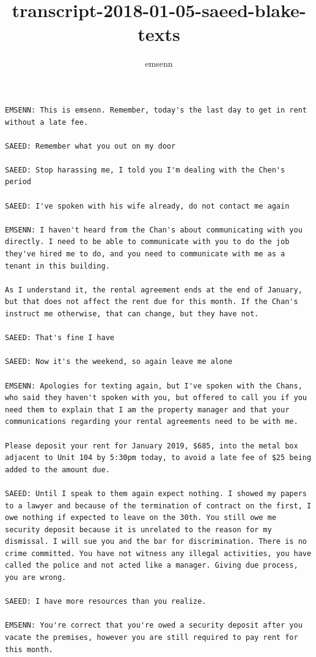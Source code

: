 \documentclass[11pt]{article}
\author{emsenn}
\date{}
\title{transcript-2018-01-05-saeed-blake-texts}
\begin{document}
\maketitle
\begin{verbatim}
EMSENN: This is emsenn. Remember, today's the last day to get in rent
without a late fee.

SAEED: Remember what you out on my door

SAEED: Stop harassing me, I told you I'm dealing with the Chen's
period

SAEED: I've spoken with his wife already, do not contact me again

EMSENN: I haven't heard from the Chan's about communicating with you
directly. I need to be able to communicate with you to do the job
they've hired me to do, and you need to communicate with me as a
tenant in this building.

As I understand it, the rental agreement ends at the end of January,
but that does not affect the rent due for this month. If the Chan's
instruct me otherwise, that can change, but they have not.

SAEED: That's fine I have

SAEED: Now it's the weekend, so again leave me alone

EMSENN: Apologies for texting again, but I've spoken with the Chans,
who said they haven't spoken with you, but offered to call you if you
need them to explain that I am the property manager and that your
communications regarding your rental agreements need to be with me.

Please deposit your rent for January 2019, $685, into the metal box
adjacent to Unit 104 by 5:30pm today, to avoid a late fee of $25 being
added to the amount due.

SAEED: Until I speak to them again expect nothing. I showed my papers
to a lawyer and because of the termination of contract on the first, I
owe nothing if expected to leave on the 30th. You still owe me
security deposit because it is unrelated to the reason for my
dismissal. I will sue you and the bar for discrimination. There is no
crime committed. You have not witness any illegal activities, you have
called the police and not acted like a manager. Giving due process,
you are wrong.

SAEED: I have more resources than you realize.

EMSENN: You're correct that you're owed a security deposit after you
vacate the premises, however you are still required to pay rent for
this month.


\end{verbatim}
\end{document}
